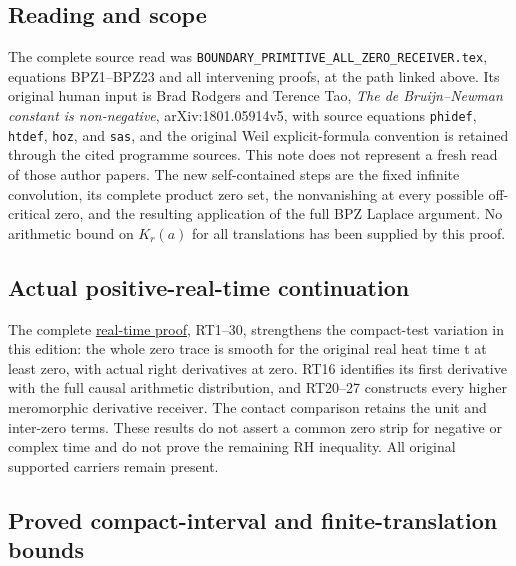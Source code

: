 \documentclass[
  10pt,
  a4paper,
]{article}
\begin{document}
\subsection{Reading and scope}\label{reading-and-scope}

The complete source read was
\texttt{BOUNDARY\_\allowbreak{}PRIMITIVE\_\allowbreak{}ALL\_\allowbreak{}ZERO\_\allowbreak{}RECEIVER.\allowbreak{}tex}, equations
BPZ1--BPZ23 and all intervening proofs, at the path linked above. Its
original human input is Brad Rodgers and Terence Tao, \emph{The de
Bruijn--Newman constant is non-negative}, arXiv:1801.05914v5, with
source equations \texttt{phidef}, \texttt{htdef}, \texttt{hoz}, and
\texttt{sas}, and the original Weil explicit-formula convention is
retained through the cited programme sources. This note does not
represent a fresh read of those author papers. The new self-contained
steps are the fixed infinite convolution, its complete product zero set,
the nonvanishing at every possible off-critical zero, and the resulting
application of the full BPZ Laplace argument. No arithmetic bound on
\(K_r(a)\) for all translations has been supplied by this proof.

\subsection{Actual positive-real-time
continuation}\label{actual-positive-real-time-continuation}

The complete \href{REAL_TIME_HEAT_TRACE_DERIVATION.md}{real-time proof},
RT1--30, strengthens the compact-test variation in this edition: the
whole zero trace is smooth for the original real heat time t at least
zero, with actual right derivatives at zero. RT16 identifies its first
derivative with the full causal arithmetic distribution, and RT20--27
constructs every higher meromorphic derivative receiver. The contact
comparison retains the unit and inter-zero terms. These results do not
assert a common zero strip for negative or complex time and do not prove
the remaining RH inequality. All original supported carriers remain
present.

\subsection{Proved compact-interval and finite-translation
bounds}\label{proved-compact-interval-and-finite-translation-bounds}
\end{document}
